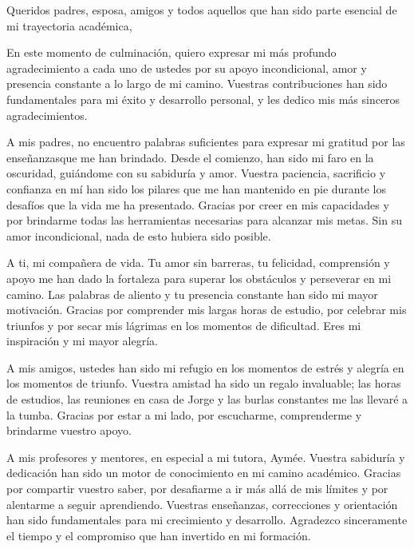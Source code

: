 \begin{acknowledgements}
    Queridos padres, esposa, amigos y todos aquellos que han sido parte esencial de mi trayectoria académica,

    En este momento de culminación, quiero expresar mi más profundo agradecimiento a cada uno de ustedes por 
    su apoyo incondicional, amor y presencia constante a lo largo de mi camino. Vuestras contribuciones han 
    sido fundamentales para mi éxito y desarrollo personal, y les dedico mis más sinceros agradecimientos.

    A mis padres, no encuentro palabras suficientes para expresar mi gratitud por las enseñanzasque me 
    han brindado. Desde el comienzo, han sido mi faro en la oscuridad, guiándome con su sabiduría y amor. Vuestra 
    paciencia, sacrificio y confianza en mí han sido los pilares que me han mantenido en pie durante los 
    desafíos que la vida me ha presentado. Gracias por creer en mis capacidades y por brindarme todas las herramientas 
    necesarias para alcanzar mis metas. Sin su amor incondicional, nada de esto hubiera sido posible.

    A ti, mi compañera de vida. Tu amor sin barreras, tu felicidad, 
    comprensión y apoyo me han dado la fortaleza para superar los obstáculos y perseverar en mi camino. 
    Las palabras de aliento y tu presencia constante han sido mi mayor motivación. Gracias por comprender 
    mis largas horas de estudio, por celebrar mis triunfos y por secar mis lágrimas en los momentos de 
    dificultad. Eres mi inspiración y mi mayor alegría.

    A mis amigos, ustedes han sido mi refugio en los momentos de estrés y alegría en los momentos de 
    triunfo. Vuestra amistad ha sido un regalo invaluable; las horas de estudios, las reuniones en casa de 
    Jorge y las burlas constantes me las llevaré a la tumba. Gracias por estar a mi lado, 
    por escucharme, comprenderme y brindarme vuestro apoyo.

    A mis profesores y mentores, en especial a mi tutora, Aymée. Vuestra sabiduría y dedicación han 
    sido un motor de conocimiento en mi camino académico. Gracias por compartir vuestro saber, por 
    desafiarme a ir más allá de mis límites y por alentarme a seguir aprendiendo. Vuestras enseñanzas, 
    correcciones y orientación han sido fundamentales para mi crecimiento y desarrollo. Agradezco 
    sinceramente el tiempo y el compromiso que han invertido en mi formación.
\end{acknowledgements}